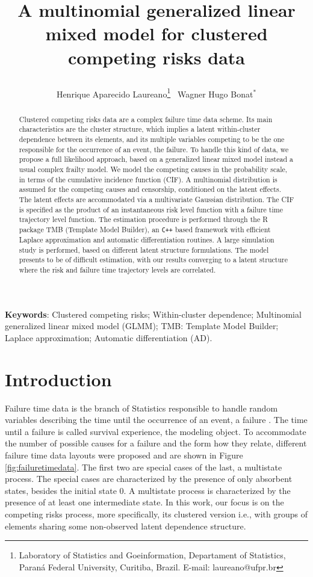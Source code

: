 \documentclass[a4paper,12pt]{article}
\title{
  
  A multinomial generalized linear mixed model for clustered competing
  risks data

}
\author{
  Henrique Aparecido Laureano\thanks{
    Laboratory of Statistics and Goeinformation,
    Departament of Statistics,
    Paran\'{a} Federal University, Curitiba, Brazil.
    E-mail: laureano@ufpr.br
  }~
  Wagner Hugo Bonat$^\ast$}
\begin{document}
\maketitle

\begin{abstract}

  Clustered competing risks data are a complex failure time data
  scheme. Its main characteristics are the cluster structure, which
  implies a latent within-cluster dependence between its elements, and
  its multiple variables competing to be the one responsible for the
  occurrence of an event, the failure. To handle this kind of data, we
  propose a full likelihood approach, based on a generalized linear
  mixed model instead a usual complex frailty model. We model the
  competing causes in the probability scale, in terms of the cumulative
  incidence function (CIF). A multinomial distribution is assumed for
  the competing causes and censorship, conditioned on the latent
  effects. The latent effects are accommodated via a multivariate
  Gaussian distribution. The CIF is specified as the product of an
  instantaneous risk level function with a failure time trajectory level
  function. The estimation procedure is performed through the R package
  TMB (Template Model Builder), an \texttt{C++} based framework with
  efficient Laplace approximation and automatic differentiation
  routines. A large simulation study is performed, based on different
  latent structure formulations. The model presents to be of difficult
  estimation, with our results converging to a latent structure where
  the risk and failure time trajectory levels are correlated.

\end{abstract}

\begin{flushleft}
 \textbf{Keywords}: 
 Clustered competing risks;
 Within-cluster dependence;
 Multinomial generalized linear mixed model (GLMM);
 TMB: Template Model Builder;
 Laplace approximation;
 Automatic differentiation (AD).                    
\end{flushleft}

\section{Introduction}

Failure time data is the branch of Statistics responsible to handle
random variables describing the time until the occurrence of an event, a
failure \citep{kalb&prentice,hougaard00}. The time until a failure is
called survival experience, the modeling object. To accommodate the
number of possible causes for a failure and the form how they relate,
different failure time data layouts were proposed and are shown in
Figure \ref{fig:failuretimedata}. The first two are special cases of the
last, a multistate process. The special cases are characterized by the
presence of only absorbent states, besides the initial state 0. A
multistate process is characterized by the presence of at least one
intermediate state. In this work, our focus is on the competing risks
process, more specifically, its clustered version i.e., with groups of
elements sharing some non-observed latent dependence structure.
\end{document}
